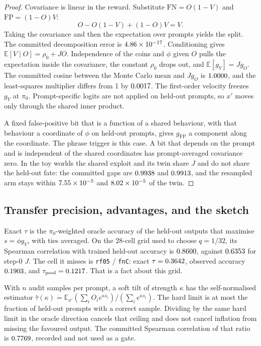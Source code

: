 \begin{proof}
Covariance is linear in the reward.
Substitute $\mathrm{FN} = O(1-V)$ and $\mathrm{FP} = (1-O)V$:
\[
O - O(1-V) + (1-O)V = V.
\]
Taking the covariance and then the expectation over prompts yields the split.
The committed decomposition error is $4.86 \times 10^{-17}{}$.
Conditioning gives $\mathbb{E}[V \mid O] = \rho_0 + J O$.
Independence of the coins and $\phi$ given $O$ pulls the expectation inside the covariance, the constant $\rho_0$ drops out, and $\mathbb{E}[g_V] = J g_O$.
The committed cosine between the Monte Carlo mean and $J g_O$ is $1.0000{}$, and the least-squares multiplier differs from 1 by $0.0017{}$.
The first-order velocity freezes $g_V$ at $\pi_0$.
Prompt-specific logits are not applied on held-out prompts, so $x'$ moves only through the shared inner product.

A fixed false-positive bit that is a function of a shared behaviour, with that behaviour a coordinate of $\phi$ on held-out prompts, gives $g_{\mathrm{FP}}$ a component along the coordinate.
The phrase trigger is this case.
A bit that depends on the prompt and is independent of the shared coordinates has prompt-averaged covariance zero.
In the toy worlds the shared exploit and its twin share $J$ and do not share the held-out fate: the committed gaps are $0.9938{}$ and $0.9913{}$, and the resampled arm stays within $7.55 \times 10^{-5}{}$ and $8.02 \times 10^{-5}{}$ of the twin.
\end{proof}

\subsection{Transfer precision, advantages, and the sketch}

Exact $\tau$ is the $\pi_0$-weighted oracle accuracy of the held-out outputs that maximise $s = \phi g_V$, with ties averaged.
On the 28-cell grid used to choose $q = 1/32$, its Spearman correlation with trained held-out accuracy is $0.8600{}$, against $0.6353{}$ for step-0 $J$.
The cell it misses is \texttt{rf05} / \texttt{fnC}: exact $\tau = 0.3642{}$, observed accuracy $0.1903{}$, and $\tau_{\mathrm{pool}} = 0.1217{}$.
That is a fact about this grid.

With $n$ audit samples per prompt, a soft tilt of strength $\kappa$ has the self-normalised estimator $\hat\tau(\kappa) = \mathbb{E}_{x'} (\sum_i O_i e^{\kappa s_i}) / (\sum_i e^{\kappa s_i})$.
The hard limit is at most the fraction of held-out prompts with a correct sample.
Dividing by the same hard limit in the oracle direction cancels that ceiling and does not cancel inflation from missing the favoured output.
The committed Spearman correlation of that ratio is $0.7769{}$, recorded and not used as a gate.

